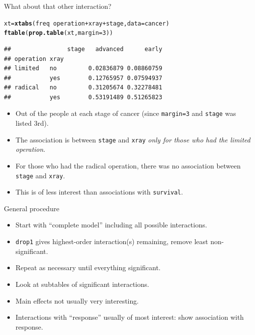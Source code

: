 \documentclass[unknownkeysallowed]{beamer}\usepackage[]{graphicx}\usepackage[]{color}
\makeatletter
\newcommand{\hlnum}[1]{\textcolor[rgb]{0.686,0.059,0.569}{#1}}%
\newcommand{\hlopt}[1]{\textcolor[rgb]{0,0,0}{#1}}%
\newcommand{\hlstd}[1]{\textcolor[rgb]{0.345,0.345,0.345}{#1}}%
\newcommand{\hlkwb}[1]{\textcolor[rgb]{0.69,0.353,0.396}{#1}}%
\newcommand{\hlkwc}[1]{\textcolor[rgb]{0.333,0.667,0.333}{#1}}%
\newcommand{\hlkwd}[1]{\textcolor[rgb]{0.737,0.353,0.396}{\textbf{#1}}}%
\newenvironment{kframe}{%
 \def\at@end@of@kframe{}%
 \ifinner\ifhmode%
  \def\at@end@of@kframe{\end{minipage}}%
  \begin{minipage}{\columnwidth}%
 \fi\fi%
 \def\FrameCommand##1{\hskip\@totalleftmargin \hskip-\fboxsep
 \colorbox{shadecolor}{##1}\hskip-\fboxsep
     \hskip-\linewidth \hskip-\@totalleftmargin \hskip\columnwidth}%
 \MakeFramed {\advance\hsize-\width
   \@totalleftmargin\z@ \linewidth\hsize
   \@setminipage}}%
 {\par\unskip\endMakeFramed%
 \at@end@of@kframe}
\newenvironment{knitrout}{}{} %
\makeatother
\begin{document}
\begin{frame}[fragile]{What about that other interaction?}
  
\begin{knitrout}
\color{fgcolor}\begin{kframe}
\begin{alltt}
\hlstd{xt}\hlkwb{=}\hlkwd{xtabs}\hlstd{(freq}\hlopt{~}\hlstd{operation}\hlopt{+}\hlstd{xray}\hlopt{+}\hlstd{stage,}\hlkwc{data}\hlstd{=cancer)}
\hlkwd{ftable}\hlstd{(}\hlkwd{prop.table}\hlstd{(xt,}\hlkwc{margin}\hlstd{=}\hlnum{3}\hlstd{))}
\end{alltt}
\begin{verbatim}
##                stage   advanced      early
## operation xray                            
## limited   no         0.02836879 0.08860759
##           yes        0.12765957 0.07594937
## radical   no         0.31205674 0.32278481
##           yes        0.53191489 0.51265823
\end{verbatim}
\end{kframe}
\end{knitrout}

\begin{itemize}
\item Out of the people at each stage of cancer (since
  \texttt{margin=3} and \texttt{stage} was listed 3rd).
\item The association is between \texttt{stage} and \texttt{xray}
  \emph{only for those who had the limited operation}.
\item For those who
  had the radical operation, there was no association between
  \texttt{stage} and \texttt{xray}.
\item This is of less interest than associations with
  \texttt{survival}. 
\end{itemize}
  
\end{frame}

\begin{frame}[fragile]{General procedure}

\begin{itemize}
\item Start with ``complete model'' including all possible interactions.
\item \texttt{drop1} gives highest-order interaction(s) remaining, remove least non-significant.
\item Repeat as necessary until everything significant.
\item Look at subtables of significant interactions.
  \item Main effects not usually very interesting.
\item Interactions with ``response'' usually of most interest: show association with response.
\end{itemize}



\end{frame}
\end{document}
